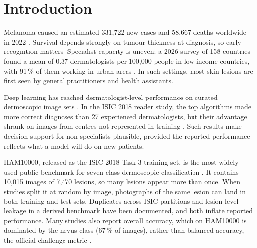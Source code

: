 \documentclass[11pt,a4paper]{article}
\newcommand{\pct}{\,\%}
\begin{document}
\section{Introduction}
Melanoma caused an estimated 331,722 new cases and 58,667 deaths worldwide in 2022 \cite{bray2024,iarc2024}. Survival depends strongly on tumour thickness at diagnosis, so early recognition matters. Specialist capacity is uneven: a 2026 survey of 158 countries found a mean of 0.37 dermatologists per 100,000 people in low-income countries, with 91\pct{} of them working in urban areas \cite{freeman2026}. In such settings, most skin lesions are first seen by general practitioners and health assistants.

Deep learning has reached dermatologist-level performance on curated dermoscopic image sets \cite{esteva2017,haenssle2018,tschandl2019}. In the ISIC 2018 reader study, the top algorithms made more correct diagnoses than 27 experienced dermatologists, but their advantage shrank on images from centres not represented in training \cite{tschandl2019}. Such results make decision support for non-specialists plausible, provided the reported performance reflects what a model will do on new patients.

HAM10000, released as the ISIC 2018 Task 3 training set, is the most widely used public benchmark for seven-class dermoscopic classification \cite{codella2019,tschandl2018}. It contains 10,015 images of 7,470 lesions, so many lesions appear more than once. When studies split it at random by image, photographs of the same lesion can land in both training and test sets. Duplicates across ISIC partitions \cite{cassidy2022} and lesion-level leakage in a derived benchmark \cite{abhishek2025} have been documented, and both inflate reported performance. Many studies also report overall accuracy, which on HAM10000 is dominated by the nevus class (67\pct{} of images), rather than balanced accuracy, the official challenge metric \cite{codella2019}.
\end{document}
